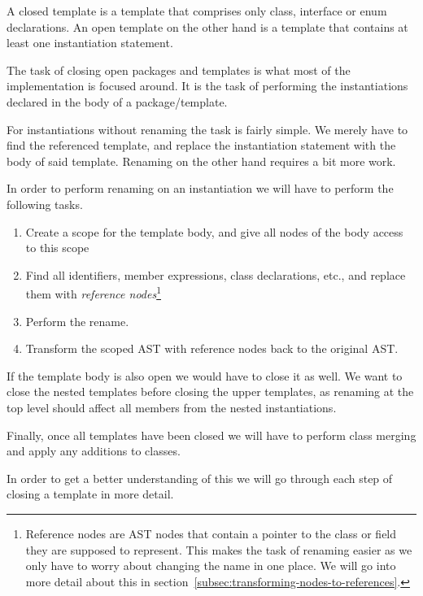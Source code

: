 A closed template is a template that comprises only class, interface or enum declarations.
An open template on the other hand is a template that contains at least one instantiation statement.

The task of closing open packages and templates is what most of the implementation is focused around.
It is the task of performing the instantiations declared in the body of a package/template.

For instantiations without renaming the task is fairly simple.
We merely have to find the referenced template, and replace the instantiation statement with the body of said template.
Renaming on the other hand requires a bit more work.

In order to perform renaming on an instantiation we will have to perform the following tasks.
\begin{enumerate}
    \item Create a scope for the template body, and give all nodes of the body access to this scope
    \item Find all identifiers, member expressions, class declarations, etc., and replace them with \textit{reference nodes}\footnote{Reference nodes are AST nodes that contain a pointer to the class or field they are supposed to represent. This makes the task of renaming easier as we only have to worry about changing the name in one place. We will go into more detail about this in section~\vref{subsec:transforming-nodes-to-references}.}
    \item Perform the rename.
    \item Transform the scoped AST with reference nodes back to the original AST\@.
\end{enumerate}

If the template body is also open we would have to close it as well.
We want to close the nested templates before closing the upper templates, as renaming at the top level should affect all members from the nested instantiations.

Finally, once all templates have been closed we will have to perform class merging and apply any additions to classes.

In order to get a better understanding of this we will go through each step of closing a template in more detail.

